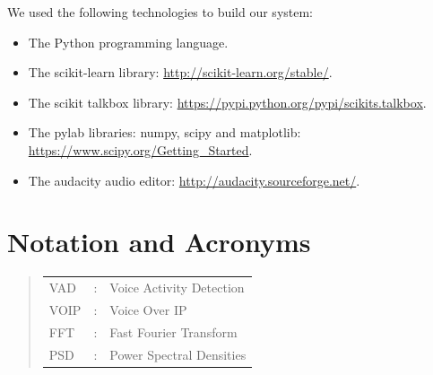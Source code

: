 \documentclass[ %
                    author={Sam Phippen},
                supervisor={Dr. Rafal Bogacz},
                     title={Real time voice activity detectors in noisy personal computing environments},
                  subtitle={},
                    degree={MEng},
                      year={2012} ]{thesis}
\begin{document}
We used the following technologies to build our system:

\begin{itemize}

    \item The Python programming language.

    \item The scikit-learn library: \url{http://scikit-learn.org/stable/}.

    \item The scikit talkbox library:
        \url{https://pypi.python.org/pypi/scikits.talkbox}.

    \item The pylab libraries: numpy, scipy and matplotlib:
        \url{https://www.scipy.org/Getting_Started}.

    \item The audacity audio editor: \url{http://audacity.sourceforge.net/}.

\end{itemize}


\chapter*{Notation and Acronyms}

\vspace{1cm}

\noindent

\begin{quote}
\noindent
\begin{tabular}{lcl}
VAD                 &:     & Voice Activity Detection                 \\
VOIP                &:     & Voice Over IP\\
FFT                 &:     & Fast Fourier Transform\\
PSD                 &:     & Power Spectral Densities\\
\end{tabular}
\end{quote}
\end{document}
